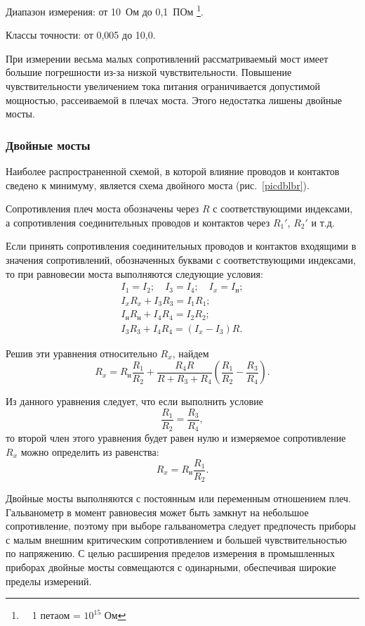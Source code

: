 \documentclass[pscyr,titlepage]{hedreport}
\newcommand{\Pic}[1]{\ref{pic#1}}
\newcommand{\pic}[1]{рис.~\Pic{#1}}
\begin{document}
  Диапазон измерения: от 10~Ом до 0,1~ПОм%
    \footnote{\ \ 1 петаом = \( 10^{15} \) Ом}.
  
  Классы точности: от 0,005 до 10,0.

  При измерении весьма малых сопротивлений рассматриваемый мост имеет
  большие погрешности из-за низкой чувствительности. Повышение
  чувствительности увеличением тока питания ограничивается допустимой мощностью,
  рассеиваемой в плечах моста. Этого недостатка лишены двойные мосты.

  \subsubsection{Двойные мосты}

  Наиболее распространенной схемой, в которой влияние проводов и контактов
  сведено к минимуму, является схема двойного моста (\pic{dblbr}).
  
  Сопротивления плеч моста обозначены через \( R \) с соответствующими
  индексами, а сопротивления соединительных проводов и контактов через
  \( R_1' \), \( R_2' \) и т.д.
  
  Если принять сопротивления соединительных проводов и контактов входящими в
  значения сопротивлений, обозначенных буквами с соответствующими индексами, то
  при равновесии моста выполняются следующие условия:
  \begin{gather*}
    I_1 = I_2; \quad I_3 = I_4; \quad I_x = I_\text{н}; \\
    I_x R_x + I_3 R_3 = I_1 R_1; \\
    I_\text{н} R_\text{н} + I_4 R_4 = I_2 R_2; \\
    I_3 R_3 + I_4 R_4 = (I_x - I_3) R.
  \end{gather*}

  Решив эти уравнения относительно \( R_x \), найдем
  \[
    R_x = R_\text{н} \frac{R_1}{R_2} + \frac{R_4 R}{R + R_3 + R_4}
      \left( \frac{R_1}{R_2} - \frac{R_3}{R_4} \right).
  \]
  
  Из данного уравнения следует, что если выполнить условие
  \[
    \frac{R_1}{R_2} = \frac{R_3}{R_4},
  \]
  то второй член этого уравнения будет равен нулю и измеряемое сопротивление
  \( R_x \) можно определить из равенства:
  \[
    R_x = R_\text{н} \frac{R_1}{R_2}.
  \]

  Двойные мосты выполняются с постоянным или переменным отношением плеч.
  Гальванометр в момент равновесия может быть замкнут на небольшое
  сопротивление, поэтому при выборе гальванометра следует предпочесть приборы с
  малым внешним критическим сопротивлением и большей чувствительностью
  по напряжению. С целью расширения пределов измерения в промышленных приборах
  двойные мосты совмещаются с одинарными, обеспечивая широкие пределы измерений.
  
\end{document}
